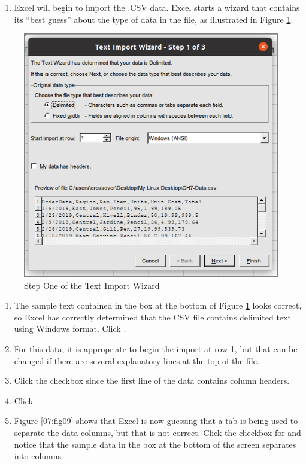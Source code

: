 \begin{enumerate}
	\item Excel will begin to import the .CSV data. Excel starts a wizard that contains its ``best guess'' about the type of data in the file, as illustrated in Figure \ref{07:fig08}.
\end{enumerate}

\begin{figure}[H]
	\centering
	\includegraphics[width=\maxwidth{.95\linewidth}]{gfx/ch07_fig08}
	\caption{Step One of the Text Import Wizard}
	\label{07:fig08}
\end{figure}

\begin{enumerate}
	\item The sample text contained in the box at the bottom of Figure \ref{07:fig08} looks correct, so Excel has correctly determined that the CSV file contains delimited text using Windows format. Click .
	\item For this data, it is appropriate to begin the import at row 1, but that can be changed if there are several explanatory lines at the top of the file.
	\item Click the  checkbox since the first line of the data contains column headers.
	\item Click .
	\item Figure \ref{07:fig09} shows that Excel is now guessing that a tab is being used to separate the data columns, but that is not correct. Click the checkbox for  and notice that the sample data in the box at the bottom of the screen separates into columns.
\end{enumerate}

